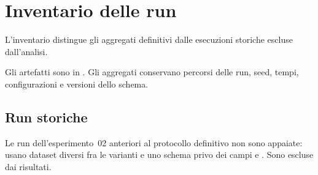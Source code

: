 \chapter{Inventario delle run}
\label{app:inventario}

L'inventario distingue gli aggregati definitivi dalle esecuzioni storiche escluse
dall'analisi.

\begin{center}\small
{}\end{center}

Gli artefatti sono in . Gli aggregati conservano percorsi
delle run, seed, tempi, configurazioni e versioni dello schema.

\section{Run storiche}

Le run dell'esperimento~02 anteriori al protocollo definitivo non sono appaiate:
usano dataset diversi fra le varianti e uno schema privo dei campi
 e . Sono escluse dai risultati.
